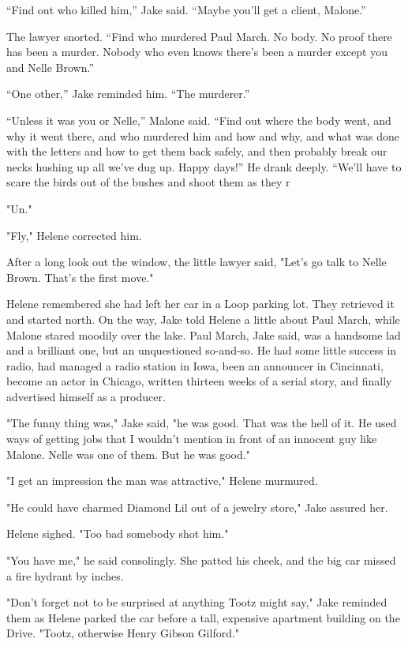 \documentclass{novel}
\begin{document}
“Find out who killed him,” Jake said. “Maybe you’ll get a client, Malone.”

The lawyer snorted. “Find who murdered Paul March. No body. No proof there has been a murder. Nobody who even knows there’s been a murder except you and Nelle Brown.”

“One other,” Jake reminded him. “The murderer.”

“Unless it was you or Nelle,” Malone said. “Find out where the body went, and why it went there, and who murdered him and how and why, and what was done with the letters and how to get them back safely, and then probably break our necks hushing up all we’ve dug up. Happy days!” He drank deeply. “We’ll have to scare the birds out of the bushes and shoot them as they r

"Un."

"Fly," Helene corrected him.

After a long look out the window, the little lawyer said, "Let’s go talk to Nelle Brown. That’s the first move."

Helene remembered she had left her car in a Loop parking lot. They retrieved it and started north. On the way, Jake told Helene a little about Paul March, while Malone stared moodily over the lake. Paul March, Jake said, was a handsome lad and a brilliant one, but an unquestioned so-and-so. He had some little success in radio, had managed a radio station in Iowa, been an announcer in Cincinnati, become an actor in Chicago, written thirteen weeks of a serial story, and finally advertised himself as a producer.

"The funny thing was," Jake said, "he was good. That was the hell of it. He used ways of getting jobs that I wouldn’t mention in front of an innocent guy like Malone. Nelle was one of them. But he was good."

"I get an impression the man was attractive," Helene murmured.

"He could have charmed Diamond Lil out of a jewelry store," Jake assured her.

Helene sighed. "Too bad somebody shot him."

"You have me," he said consolingly. She patted his cheek, and the big car missed a fire hydrant by inches.

"Don’t forget not to be surprised at anything Tootz might say," Jake reminded them as Helene parked the car before a tall, expensive apartment building on the Drive. "Tootz, otherwise Henry Gibson Gilford."
\end{document}
